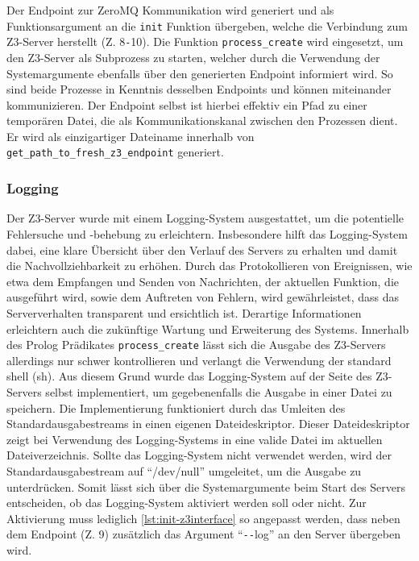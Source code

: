 Der Endpoint zur ZeroMQ Kommunikation wird generiert
und als Funktionsargument an die \texttt{init} Funktion übergeben, welche die Verbindung zum Z3-Server herstellt (Z. 8\texttt{-}10).
Die Funktion \texttt{process\_create} wird eingesetzt, um den Z3-Server als Subprozess zu starten,
welcher durch die Verwendung der Systemargumente ebenfalls über den generierten Endpoint informiert wird.
So sind beide Prozesse in Kenntnis desselben Endpoints und können miteinander kommunizieren.
Der Endpoint selbst ist hierbei effektiv ein Pfad zu einer temporären Datei, die als Kommunikationskanal zwischen den Prozessen dient.
Er wird als einzigartiger Dateiname innerhalb von \texttt{get\_path\_to\_fresh\_z3\_endpoint} generiert.

\subsubsection{Logging}
\label{subsec:logging}

Der Z3-Server wurde mit einem Logging-System ausgestattet, um die potentielle Fehlersuche und -behebung zu erleichtern.
Insbesondere hilft das Logging-System dabei, eine klare Übersicht über den Verlauf des Servers zu erhalten und damit die Nachvollziehbarkeit zu erhöhen.
Durch das Protokollieren von Ereignissen, wie etwa dem Empfangen und Senden von Nachrichten, der aktuellen Funktion, die ausgeführt wird, sowie dem Auftreten von Fehlern,
wird gewährleistet, dass das Serververhalten transparent und ersichtlich ist.
Derartige Informationen erleichtern auch die zukünftige Wartung und Erweiterung des Systems.
Innerhalb des Prolog Prädikates \texttt{process\_create} lässt sich die Ausgabe des Z3-Servers allerdings nur schwer kontrollieren und verlangt die Verwendung der standard shell (sh).
Aus diesem Grund wurde das Logging-System auf der Seite des Z3-Servers selbst implementiert, um gegebenenfalls die Ausgabe in einer Datei zu speichern.
Die Implementierung funktioniert durch das Umleiten des Standardausgabestreams in einen eigenen Dateideskriptor.
Dieser Dateideskriptor zeigt bei Verwendung des Logging-Systems in eine valide Datei im aktuellen Dateiverzeichnis.
Sollte das Logging-System nicht verwendet werden, wird der Standardausgabestream auf \enquote{/dev/null} umgeleitet, um die Ausgabe zu unterdrücken.
Somit lässt sich über die Systemargumente beim Start des Servers entscheiden, ob das Logging-System aktiviert werden soll oder nicht.
Zur Aktivierung muss lediglich \cref{lst:init-z3interface} so angepasst werden, dass neben dem Endpoint (Z. 9) zusätzlich das Argument \enquote{\texttt{-}\texttt{-}log} an den Server übergeben wird.

